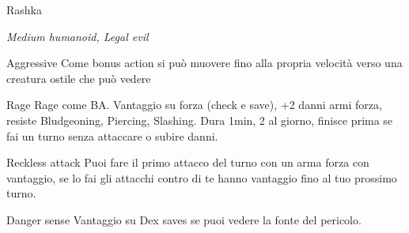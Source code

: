 \documentclass[10pt,twoside, twocolumn, openany]{dndbook}
\begin{document}
\begin{DndMonster}{Rashka}%
  \begin{hangingpar}
    \textit{Medium humanoid, Legal evil}
  \end{hangingpar}
  \DndMonsterBasics[%
  armorclass = 13,
  hitpoints  = \DndDice{3d12 + 6},
  speed      = {30 ft.},
  ]
  \DndMonsterAbilityScores[
      str = 16, 
      dex = 10,
      con = 16,
      int = 12,
      wis = 13,
      cha = 8,
  ]
  \DndMonsterDetails[
    skills = {Perception +3, Survival +5},
    senses = {darkvision 60 ft., passive Perception 11},
    languages = {Common, Orchish},
    challenge = {Calcolare},
  ]
  \begin{DndMonsterAction}{Aggressive}
    Come bonus action si può muovere fino alla propria velocità verso una creatura ostile che può vedere
  \end{DndMonsterAction}

  \begin{DndMonsterAction}{Rage}
    Rage come BA. Vantaggio su forza (check e save), +2 danni armi forza, resiste Bludgeoning, Piercing, Slashing. Dura 1min, 2 al giorno, finisce prima se fai un turno senza attaccare o subire danni. 
  \end{DndMonsterAction}
  \begin{DndMonsterAction}{Reckless attack}
    Puoi fare il primo attacco del turno con un arma forza con vantaggio, se lo fai gli attacchi contro di te hanno vantaggio fino al tuo prossimo turno.
  \end{DndMonsterAction}
  \begin{DndMonsterAction}{Danger sense}
    Vantaggio su Dex saves se puoi vedere la fonte del pericolo.
  \end{DndMonsterAction}
  
  
  \DndMonsterMelee[
    name=Greataxe,
    mod=+5,
    reach=5,
    targets=one target,
    dmg=\DndDice{1d12+3},
    dmg-type = Slashing,
  ]
  
\end{DndMonster}
\end{document}
